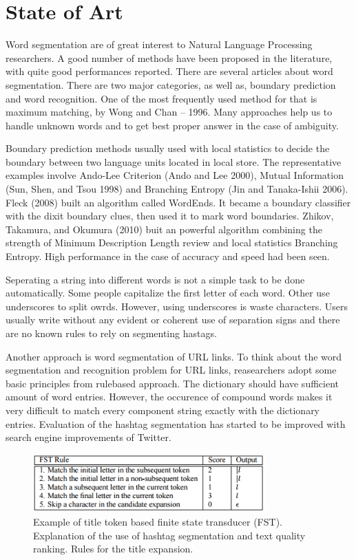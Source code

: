 \documentclass[12pt]{comjnl}
\begin{document}
\section{State of Art}

Word segmentation are of great interest to Natural Language Processing researchers. 
A good number of methods have been proposed in the literature, with quite good 
performances reported. There are several articles about word segmentation. 
There are two major categories, as well as, boundary prediction and word 
recognition. One of the most frequently used method
for that is maximum matching, by Wong and Chan – 1996. Many approaches help us to handle
unknown words and to get best proper answer in the case of ambiguity.

Boundary prediction methods usually used with local statistics
to decide the boundary between two language units located in local store. The representative
examples involve Ando-Lee Criterion (Ando and Lee 2000),
Mutual Information (Sun, Shen, and Tsou 1998) and
Branching Entropy (Jin and Tanaka-Ishii 2006). Fleck (2008) built an algorithm called
WordEnds. It became a boundary classifier with the dixit
boundary clues, then used it to mark word boundaries.
Zhikov, Takamura, and Okumura (2010) buit
an powerful algorithm combining the strength of Minimum
Description Length review and local statistics Branching Entropy.
High performance in the case of accuracy and speed had been seen.

Seperating a string into different words is not a simple task to be done automatically. Some people capitalize the first letter of each word. Other use underscores to split owrds. However, using underscores is waste characters. Users usually write without any evident or coherent use of separation signs and there are no known rules to rely on segmenting hastags.

Another approach is word segmentation of URL links. To think about the word segmentation and
recognition problem for URL links, reasearchers adopt some basic principles from rule­based
approach. The dictionary should have sufficient amount of word entries. However, the occurence
of compound words makes it very difficult to match every component string exactly with the
dictionary entries. Evaluation of the hashtag segmentation has started to be improved with search engine
improvements of Twitter.

\begin{figure}
\centering
\includegraphics[width=3.5in]{method.png}
\caption{Example of title token based finite state transducer (FST). Explanation of the use of hashtag segmentation and text quality ranking. Rules for the title expansion.}\label{fig:Tweet}
\end{figure}
\end{document}
